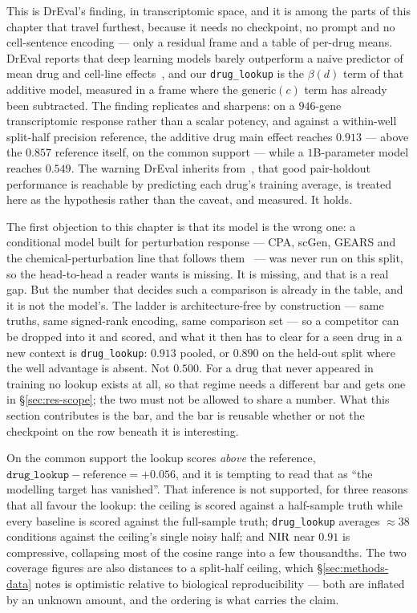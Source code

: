 This is DrEval's finding, in transcriptomic space, and it is among the parts of this chapter that
travel furthest, because it needs no checkpoint, no prompt and no cell-sentence encoding --- only a
residual frame and a table of per-drug means. DrEval reports that deep learning models barely
outperform a naive predictor of mean drug and cell-line effects~\cite{dreval}, and our
\texttt{drug\_lookup} is the $\beta(d)$ term of that additive model, measured in a frame where the
$\textrm{generic}(c)$ term has already been subtracted. The finding replicates and sharpens: on a
$946$-gene transcriptomic response rather than a scalar potency, and against a within-well
split-half precision reference, the additive drug main effect reaches $0.913$ --- above the $0.857$
reference itself, on the common support --- while a $1$B-parameter model reaches $0.549$. The warning DrEval inherits
from~\cite{partin}, that good pair-holdout performance is reachable by predicting each drug's
training average, is treated here as the hypothesis rather than the caveat, and measured. It
holds.

The first objection to this chapter is that its model is the wrong one: a conditional model built
for perturbation response --- CPA, scGen, GEARS and the chemical-perturbation line that follows
them~\cite{cpa,scgen,gears} --- was never run on this split, so the head-to-head a reader wants is
missing. It is missing, and that is a real gap. But the number that decides such a comparison is
already in the table, and it is not the model's. The ladder is architecture-free by construction ---
same truths, same signed-rank encoding, same comparison set --- so a competitor can be dropped into
it and scored, and what it then has to clear for a seen drug in a new context is
\texttt{drug\_lookup}: $0.913$ pooled, or $0.890$ on the held-out split where the well advantage is
absent. Not $0.500$. For a drug that never appeared in training no lookup exists at all, so that
regime needs a different bar and gets one in \S\ref{sec:res-scope}; the two must not be allowed to
share a number. What this section contributes is the bar, and the bar is reusable whether or not
the checkpoint on the row beneath it is interesting.

On the common support the lookup scores \emph{above} the reference,
$\texttt{drug\_lookup} - \textrm{reference} = +0.056$, and it is tempting to read that as ``the
modelling target has vanished''. That inference is not supported, for three reasons that all favour
the lookup: the
ceiling is scored against a half-sample truth while every baseline is scored against the full-sample
truth; \texttt{drug\_lookup} averages $\approx 38$ conditions against the ceiling's single noisy
half; and $\textrm{NIR}$ near $0.91$ is compressive, collapsing most of the cosine range into a few
thousandths. The two coverage figures are also distances to a split-half ceiling, which
\S\ref{sec:methods-data} notes is optimistic relative to biological reproducibility --- both are
inflated by an unknown amount, and the ordering is what carries the claim.

